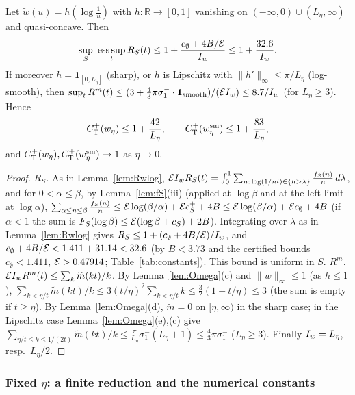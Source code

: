 \begin{lemma}\label{lem:CTlimit}
Let $\widetilde w(u)=h(\log\frac1u)$ with $h:\mathbb R\to[0,1]$ vanishing on $(-\infty,0)\cup(L_\eta,\infty)$ and quasi-concave. Then
\[
 \sup_S\ \operatorname*{ess\,sup}_tR_S(t)\le1+\frac{c_\emptyset+4B/\Ec}{\WIw}\le1+\frac{32.6}{\WIw}.
\]
If moreover $h=\mathbf 1_{[0,L_\eta]}$ (sharp), or $h$ is Lipschitz with $\|h'\|_\infty\le\pi/L_\eta$ (log-smooth), then
$\sup_tR^m(t)\le(3+\frac43\pi\sigma_1^-\cdot\mathbf 1_{\rm smooth})/(\mathcal{E}I_w)\le8.7/I_w$ (for $L_\eta\ge3$). Hence
\[
 C^{+}_{\mathrm T}(w_\eta)\le1+\frac{42}{L_\eta},\qquad C^{+}_{\mathrm T}(w^{\rm sm}_\eta)\le1+\frac{83}{L_\eta},
\]
and $C^{+}_{\mathrm T}(w_\eta),C^{+}_{\mathrm T}(w^{\rm sm}_\eta)\to1$ as $\eta\to0$.
\end{lemma}

\begin{proof}
\emph{$R_S$.} As in Lemma~\ref{lem:Rwlog}, $\mathcal{E}I_w R_S(t)=\int_0^1\sum_{n:\,\log(1/nt)\in\{h>\lambda\}}\frac{f_S(n)}n\,d\lambda$, and for
$0<\alpha\le\beta$, by Lemma~\ref{lem:fS}(iii) (applied at $\log\beta$ and at the left limit at $\log\alpha$),
$\sum_{\alpha\le n\le\beta}\frac{f_S(n)}n\le\mathcal{E}\log(\beta/\alpha)+\mathcal{E} c_S^++4B\le\mathcal{E}\log(\beta/\alpha)+\mathcal{E} c_\emptyset+4B$ (if $\alpha<1$ the sum is
$F_S(\log\beta)\le\mathcal{E}(\log\beta+c_S)+2B$). Integrating over $\lambda$ as in Lemma~\ref{lem:Rwlog} gives
$R_S\le1+(c_\emptyset+4B/\mathcal{E})/I_w$, and $c_\emptyset+4B/\mathcal{E}<1.411+31.14<32.6$ (by $B<3.73$ and the certified bounds $c_\emptyset<1.411$, $\mathcal{E}>0.47914$; Table~\ref{tab:constants}). This bound is uniform in $S$.
\emph{$R^m$.} $\mathcal{E}I_w R^m(t)\le\sum_k\widetilde m(kt)/k$. By Lemma~\ref{lem:Omega}(c) and $\|\widetilde w\|_\infty\le1$ (as $h\le1$), $\sum_{k<\eta/t}\widetilde m(kt)/k\le3(t/\eta)^2\sum_{k<\eta/t}k
\le\frac32(1+t/\eta)\le3$ (the sum is empty if $t\ge\eta$). By Lemma~\ref{lem:Omega}(d), $\widetilde m=0$ on $[\eta,\infty)$ in the sharp case;
in the Lipschitz case Lemma~\ref{lem:Omega}(e),(c) give $\sum_{\eta/t\le k\le1/(2t)}\widetilde m(kt)/k\le\frac\pi{L_\eta}\sigma_1^-(L_\eta+1)\le\frac43\pi\sigma_1^-$
($L_\eta\ge3$). Finally $I_w=L_\eta$, resp.\ $L_\eta/2$.
\end{proof}

\subsubsection*{Fixed $\eta$: a finite reduction and the numerical constants}

